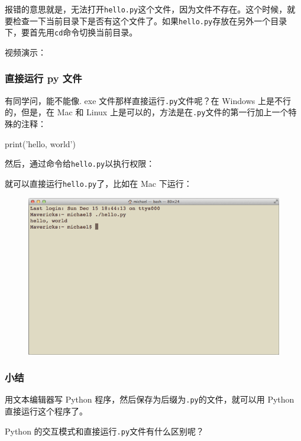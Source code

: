 报错的意思就是，无法打开\texttt{hello.py}这个文件，因为文件不存在。这个时候，就要检查一下当前目录下是否有这个文件了。如果\texttt{hello.py}存放在另外一个目录下，要首先用\texttt{cd}命令切换当前目录。

视频演示：

\hypertarget{ux76f4ux63a5ux8fd0ux884c-py-ux6587ux4ef6}{%
\subsubsection{直接运行 py
文件}\label{ux76f4ux63a5ux8fd0ux884c-py-ux6587ux4ef6}}

有同学问，能不能像. exe 文件那样直接运行\texttt{.py}文件呢？在 Windows
上是不行的，但是，在 Mac 和 Linux
上是可以的，方法是在\texttt{.py}文件的第一行加上一个特殊的注释：

\begin{pythoncode}
print('hello, world')
\end{pythoncode}

然后，通过命令给\texttt{hello.py}以执行权限：


就可以直接运行\texttt{hello.py}了，比如在 Mac 下运行：

 
 \begin{figure}[htp]
	\centering
	\includegraphics[width=0.6\linewidth]{fig/9236263761773440.png}
\end{figure}


\hypertarget{ux5c0fux7ed3}{%
\subsubsection{小结}\label{ux5c0fux7ed3}}

用文本编辑器写 Python 程序，然后保存为后缀为\texttt{.py}的文件，就可以用
Python 直接运行这个程序了。

Python 的交互模式和直接运行\texttt{.py}文件有什么区别呢？

